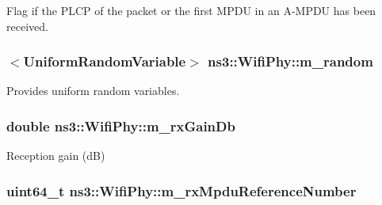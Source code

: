 Flag if the P\+L\+CP of the packet or the first M\+P\+DU in an A-\/\+M\+P\+DU has been received. 

\subsubsection[{\texorpdfstring{m\+\_\+random}{m_random}}]{$<${\bf Uniform\+Random\+Variable}$>$ ns3\+::\+Wifi\+Phy\+::m\+\_\+random\hspace{0.3cm}{\ttfamily [protected]}}\hypertarget{classns3_1_1WifiPhy_a0fd27ae928c74ebda56129b5b4248b90}{}\label{classns3_1_1WifiPhy_a0fd27ae928c74ebda56129b5b4248b90}


Provides uniform random variables. 

\subsubsection[{\texorpdfstring{m\+\_\+rx\+Gain\+Db}{m_rxGainDb}}]{\setlength{\rightskip}{0pt plus 5cm}double ns3\+::\+Wifi\+Phy\+::m\+\_\+rx\+Gain\+Db\hspace{0.3cm}{\ttfamily [private]}}\hypertarget{classns3_1_1WifiPhy_a04e38365fd444f35a3ffd84ec8e54b0e}{}\label{classns3_1_1WifiPhy_a04e38365fd444f35a3ffd84ec8e54b0e}


Reception gain (dB) 

\subsubsection[{\texorpdfstring{m\+\_\+rx\+Mpdu\+Reference\+Number}{m_rxMpduReferenceNumber}}]{\setlength{\rightskip}{0pt plus 5cm}uint64\+\_\+t ns3\+::\+Wifi\+Phy\+::m\+\_\+rx\+Mpdu\+Reference\+Number\hspace{0.3cm}{\ttfamily [protected]}}\hypertarget{classns3_1_1WifiPhy_ac4d2a0ac103e58c27743527d8289cc53}{}\label{classns3_1_1WifiPhy_ac4d2a0ac103e58c27743527d8289cc53}


